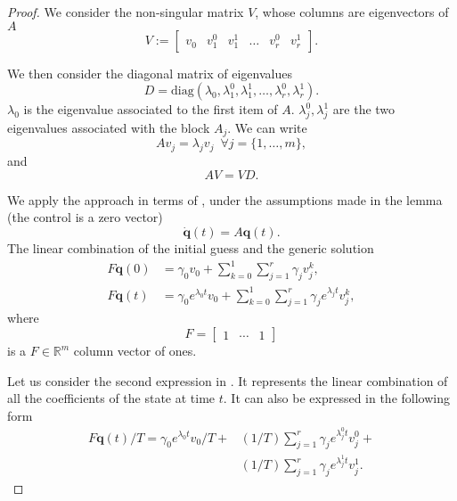 \begin{proof}
We consider the non-singular matrix $V$, whose columns are eigenvectors of $A$ 
\begin{equation}
  V:=\begin{bmatrix}v_0 & v_1^0 & v_1^1 & \dots & v_r^0 & v_r^1\end{bmatrix}.
\end{equation}

We then consider the diagonal matrix of eigenvalues 
\begin{equation}
  D=\mathrm{diag}{(\lambda_0,\lambda_1^0,\lambda_1^1,\dots,\lambda_r^0,\lambda_r^1)}.
\end{equation}
$\lambda_0$ is the eigenvalue associated to the first item of $A$. $\lambda_j^0,\lambda_j^1$ are the two eigenvalues associated with the block $A_j$. We can write 
\begin{equation}
  Av_j=\lambda_jv_j\,\,\,\forall j=\{1,\dots,m\}, 
\end{equation}
and 
\begin{equation}
AV=VD.
\end{equation}

We apply the approach in terms of , under the assumptions made in the lemma (the control is a zero vector) 
\begin{equation}
  \dot{\mathbf{q}}(t)=A\mathbf{q}(t).
\end{equation}
The linear combination of the initial guess and the generic solution
\begin{subequations}\label{eq:proof-comb}\begin{align}
  F\mathbf{q}(0)&=\gamma_0 v_0+\sum_{k=0}^{1}{\sum_{j=1}^{r}{\gamma_j v_j^k}},\\
  F\mathbf{q}(t)&=\gamma_0 e^{\lambda_0 t} v_0+\sum_{k=0}^{1}{\sum_{j=1}^{r}{\gamma_j e^{\lambda_j t} v_j^k}},
\end{align}\end{subequations}
where 
\begin{equation}
  F=\begin{bmatrix}1 & \cdots & 1\end{bmatrix}
\end{equation} 
is a $F\in\mathbb{R}^m$ column vector of ones. 

Let us consider the second expression in . It represents the linear combination of all the coefficients of the state at time $t$. It can also be expressed in the following form
\begin{equation}\label{eq:proof-output}\begin{split}
  F\mathbf{q}(t)/T=\gamma_0 e^{\lambda_0t}v_0/T+&(1/T)\sum_{j=1}^r{\gamma_j e^{\lambda_j^0t}v_j^0}+\\&(1/T)\sum_{j=1}^r{\gamma_j e^{\lambda_j^1t}v_j^1}.
\end{split}\end{equation}


\end{proof}
